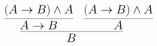 \documentclass[14pt,border=2pt]{standalone}
\begin{document}
        $$
        \LARGE 

\begin{prooftree}
\hypo{(A \to B) \land A}
\infer1{A \to B}
\hypo{(A \to B) \land A}
\infer1{A}
\infer2{B}
\end{prooftree}
        $$
        
\end{document}

